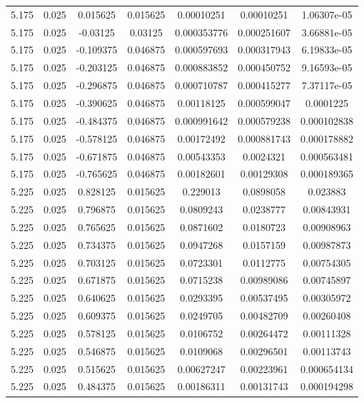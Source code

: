 \begin{flushleft}
\begin{longtable}{ccccccc}
5.175 & 0.025 & 0.015625 & 0.015625 & 0.00010251 & 0.00010251 & 1.06307e-05  \\ 
5.175 & 0.025 & -0.03125 & 0.03125 & 0.000353776 & 0.000251607 & 3.66881e-05  \\ 
5.175 & 0.025 & -0.109375 & 0.046875 & 0.000597693 & 0.000317943 & 6.19833e-05  \\ 
5.175 & 0.025 & -0.203125 & 0.046875 & 0.000883852 & 0.000450752 & 9.16593e-05  \\ 
5.175 & 0.025 & -0.296875 & 0.046875 & 0.000710787 & 0.000415277 & 7.37117e-05  \\ 
5.175 & 0.025 & -0.390625 & 0.046875 & 0.00118125 & 0.000599047 & 0.0001225  \\ 
5.175 & 0.025 & -0.484375 & 0.046875 & 0.000991642 & 0.000579238 & 0.000102838  \\ 
5.175 & 0.025 & -0.578125 & 0.046875 & 0.00172492 & 0.000881743 & 0.000178882  \\ 
5.175 & 0.025 & -0.671875 & 0.046875 & 0.00543353 & 0.0024321 & 0.000563481  \\ 
5.175 & 0.025 & -0.765625 & 0.046875 & 0.00182601 & 0.00129308 & 0.000189365  \\ 
5.225 & 0.025 & 0.828125 & 0.015625 & 0.229013 & 0.0898058 & 0.023883  \\ 
5.225 & 0.025 & 0.796875 & 0.015625 & 0.0809243 & 0.0238777 & 0.00843931  \\ 
5.225 & 0.025 & 0.765625 & 0.015625 & 0.0871602 & 0.0180723 & 0.00908963  \\ 
5.225 & 0.025 & 0.734375 & 0.015625 & 0.0947268 & 0.0157159 & 0.00987873  \\ 
5.225 & 0.025 & 0.703125 & 0.015625 & 0.0723301 & 0.0112775 & 0.00754305  \\ 
5.225 & 0.025 & 0.671875 & 0.015625 & 0.0715238 & 0.00989086 & 0.00745897  \\ 
5.225 & 0.025 & 0.640625 & 0.015625 & 0.0293395 & 0.00537495 & 0.00305972  \\ 
5.225 & 0.025 & 0.609375 & 0.015625 & 0.0249705 & 0.00482709 & 0.00260408  \\ 
5.225 & 0.025 & 0.578125 & 0.015625 & 0.0106752 & 0.00264472 & 0.00111328  \\ 
5.225 & 0.025 & 0.546875 & 0.015625 & 0.0109068 & 0.00296501 & 0.00113743  \\ 
5.225 & 0.025 & 0.515625 & 0.015625 & 0.00627247 & 0.00223961 & 0.000654134  \\ 
5.225 & 0.025 & 0.484375 & 0.015625 & 0.00186311 & 0.00131743 & 0.000194298  \\ 

\end{longtable}
\end{flushleft}
